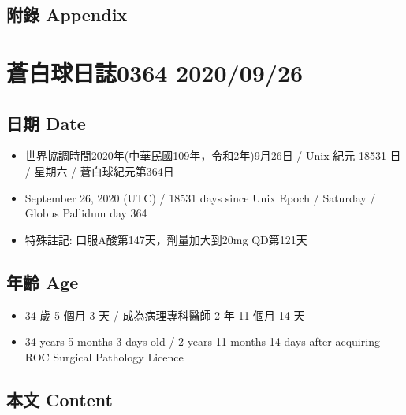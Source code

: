 \documentclass[
]{article}
\providecommand{\tightlist}{%
  \setlength{\itemsep}{0pt}\setlength{\parskip}{0pt}}
\begin{document}
\hypertarget{ux9644ux9304-appendix-24}{%
\subsection{附錄 Appendix}\label{ux9644ux9304-appendix-24}}

\hypertarget{ux84bcux767dux7403ux65e5ux8a8c0364-20200926}{%
\section{蒼白球日誌0364
2020/09/26}\label{ux84bcux767dux7403ux65e5ux8a8c0364-20200926}}

\hypertarget{ux65e5ux671f-date-25}{%
\subsection{日期 Date}\label{ux65e5ux671f-date-25}}

\begin{itemize}
\tightlist
\item
  世界協調時間2020年(中華民國109年，令和2年)9月26日 / Unix 紀元 18531 日
  / 星期六 / 蒼白球紀元第364日
\item
  September 26, 2020 (UTC) / 18531 days since Unix Epoch / Saturday /
  Globus Pallidum day 364
\item
  特殊註記: 口服A酸第147天，劑量加大到20mg QD第121天
\end{itemize}

\hypertarget{ux5e74ux9f61-age-25}{%
\subsection{年齡 Age}\label{ux5e74ux9f61-age-25}}

\begin{itemize}
\tightlist
\item
  34 歲 5 個月 3 天 / 成為病理專科醫師 2 年 11 個月 14 天
\item
  34 years 5 months 3 days old / 2 years 11 months 14 days after
  acquiring ROC Surgical Pathology Licence
\end{itemize}

\hypertarget{ux672cux6587-content-25}{%
\subsection{本文 Content}\label{ux672cux6587-content-25}}
\end{document}
